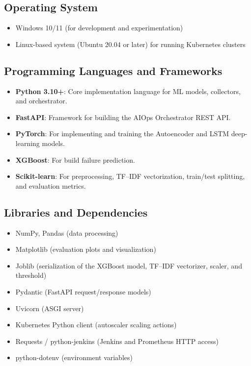 \documentclass[a4paper,14pt,onecolumn]{report}
\begin{document}
\subsection{Operating System}
\begin{itemize}
    \item Windows 10/11 (for development and experimentation)
    \item Linux-based system (Ubuntu 20.04 or later) for running Kubernetes clusters
\end{itemize}

\subsection{Programming Languages and Frameworks}
\begin{itemize}
    \item \textbf{Python 3.10+}: Core implementation language for ML models, collectors, and orchestrator.
    \item \textbf{FastAPI}: Framework for building the AIOps Orchestrator REST API.
    \item \textbf{PyTorch}: For implementing and training the Autoencoder and LSTM deep-learning models.
    \item \textbf{XGBoost}: For build failure prediction.
    \item \textbf{Scikit-learn}: For preprocessing, TF--IDF vectorization, train/test splitting, and evaluation metrics.
\end{itemize}

\subsection{Libraries and Dependencies}
\begin{itemize}
    \item NumPy, Pandas (data processing)
    \item Matplotlib (evaluation plots and visualization)
    \item Joblib (serialization of the XGBoost model, TF--IDF vectorizer, scaler, and threshold)
    \item Pydantic (FastAPI request/response models)
    \item Uvicorn (ASGI server)
    \item Kubernetes Python client (autoscaler scaling actions)
    \item Requests / python-jenkins (Jenkins and Prometheus HTTP access)
    \item python-dotenv (environment variables)
\end{itemize}
\end{document}
